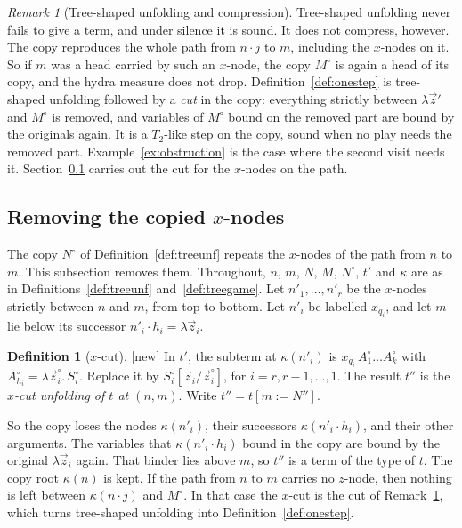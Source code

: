 \documentclass[11pt]{article}
\newcommand{\suc}[2]{#1{\cdot}#2}
\newcommand{\New}{\textsf{[new]}}
\theoremstyle{plain}
\theoremstyle{definition}
\newtheorem{definition}[theorem]{Definition}
\theoremstyle{remark}
\newtheorem{remark}[theorem]{Remark}
\begin{document}
\begin{remark}[Tree-shaped unfolding and compression]\label{rem:compress}
Tree-shaped unfolding never fails to give a term, and under silence it
is sound.  It does not compress, however.  The copy reproduces the
whole path from $\suc nj$ to $m$, including the $x$-nodes on it.  So
if $m$ was a head carried by such an $x$-node, the copy $M^\circ$ is
again a head of its copy, and the hydra measure does not drop.
Definition~\ref{def:onestep} is tree-shaped unfolding followed by a
\emph{cut} in the copy: everything strictly between $\lambda\vec z'$
and $M^\circ$ is removed, and variables of $M^\circ$ bound on the removed
part are bound by the originals again.  It is a $T_2$-like step on the copy, sound when no play needs the
removed part.  Example~\ref{ex:obstruction} is the case where the second
visit needs it.  Section~\ref{sec:xcut} carries out the cut for the
$x$-nodes on the path.
\end{remark}

\subsection{Removing the copied $x$-nodes}\label{sec:xcut}

The copy $N^\circ$ of Definition~\ref{def:treeunf} repeats the $x$-nodes
of the path from $n$ to $m$.  This subsection removes them.  Throughout,
$n$, $m$, $N$, $M$, $N^\circ$, $t'$ and $\kappa$ are as in
Definitions~\ref{def:treeunf} and~\ref{def:treegame}.  Let
$n'_1,\dots,n'_r$ be the $x$-nodes strictly between $n$ and $m$, from
top to bottom.  Let $n'_i$ be labelled $x_{q_i}$, and let $m$ lie below
its successor $\suc{n'_i}{h_i}=\lambda\vec z_i$.

\begin{definition}[$x$-cut]\label{def:xcut}
\New{} In $t'$, the subterm at $\kappa(n'_i)$ is
$x_{q_i}\,A^\circ_1\dots A^\circ_k$ with
$A^\circ_{h_i}=\lambda\vec z^\circ_i.\,S^\circ_i$.  Replace it by
$S^\circ_i[\vec z_i/\vec z^\circ_i]$, for $i=r,r-1,\dots,1$.  The result
$t''$ is the \emph{$x$-cut unfolding of $t$ at $(n,m)$}.  Write
$t''=t[m:=N'']$.
\end{definition}

So the copy loses the nodes $\kappa(n'_i)$, their successors
$\kappa(\suc{n'_i}{h_i})$, and their other arguments.  The variables
that $\kappa(\suc{n'_i}{h_i})$ bound in the copy are bound by the
original $\lambda\vec z_i$ again.  That binder lies above $m$, so $t''$
is a term of the type of $t$.  The copy root $\kappa(n)$ is kept.  If the
path from $n$ to $m$ carries no $z$-node, then nothing is left between
$\kappa(\suc nj)$ and $M^\circ$.  In that case the $x$-cut is the cut of
Remark~\ref{rem:compress}, which turns tree-shaped unfolding into
Definition~\ref{def:onestep}.
\end{document}
